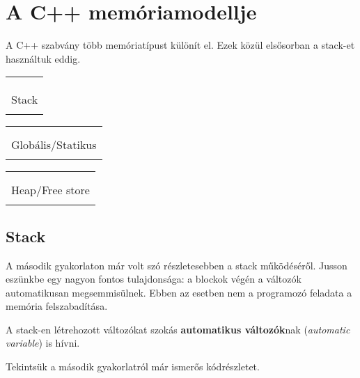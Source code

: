 \documentclass[../cpp_book/cpp_book.tex]{subfiles}
\begin{document}
	\section{A C++ memóriamodellje}
	A C++ szabvány több memóriatípust különít el. Ezek közül elsősorban a stack-et használtuk eddig.
	\begin{center}
		\begin{tabular}{|c|}
			\\
			\\
			\\
			\\
			Stack\\
			\\
			\hline
		\end{tabular}\quad 
		\begin{tabular}{|c|}
			\hline
			\quad \quad \\
			\\
			Globális/Statikus\\
			\\
			\hline
		\end{tabular}\quad 
		\begin{tabular}{|c|}
			\hline
			\quad \quad \\
			\\
			Heap/Free store\\
			\\
			\hline
		\end{tabular}
	\end{center}
	\subsection{Stack}
	A második gyakorlaton már volt szó részletesebben a stack működéséről. Jusson eszünkbe egy nagyon fontos tulajdonsága: a blockok végén a változók automatikusan megsemmisülnek. Ebben az esetben nem a programozó feladata a memória felszabadítása.
	\smallskip
	
	A stack-en létrehozott változókat szokás \textbf{automatikus változók}nak (\textit{automatic variable}) is hívni.
	
	\smallskip
	Tekintsük a második gyakorlatról már ismerős kódrészletet.
	
\end{document}

